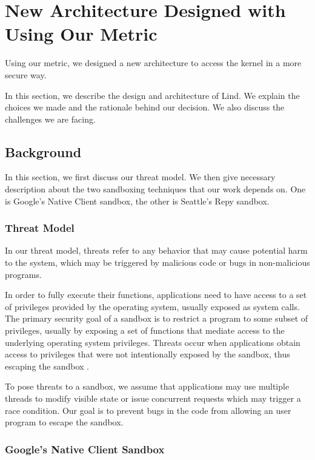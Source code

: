 \section{New Architecture Designed with Using Our Metric}
\label{sec.newarchitecture}

Using our metric, we designed a new architecture to access the kernel in a more secure way. 

In this section, we describe the design and architecture of Lind. We explain the choices we made 
and the rationale behind our decision. We also discuss the challenges we are facing.

\subsection{Background}

In this section, we first discuss our threat model. We then give necessary description about 
the two sandboxing techniques that our work depends on. One is Google's Native Client sandbox, 
the other is Seattle's Repy sandbox. 

\subsubsection{Threat Model}

In our threat model, threats refer to any behavior that may cause potential harm to the system, 
which may be triggered by malicious code or bugs in non-malicious programs.

In order to fully execute their functions, applications need to have access to a set of privileges provided by 
the operating system, usually exposed as system calls. The primary security goal of a sandbox is to 
restrict a program to some subset of privileges, usually by exposing a set of functions that mediate 
access to the underlying operating system privileges. Threats occur when applications obtain access to 
privileges that were not intentionally exposed by the sandbox, thus escaping the sandbox \cite{Repy:10}.

To pose threats to a sandbox, we assume that applications may use multiple threads to modify visible state or issue concurrent requests which may trigger a race condition. Our goal is to prevent bugs in the code from 
allowing an user program to escape the sandbox.

\subsubsection{Google's Native Client Sandbox}

